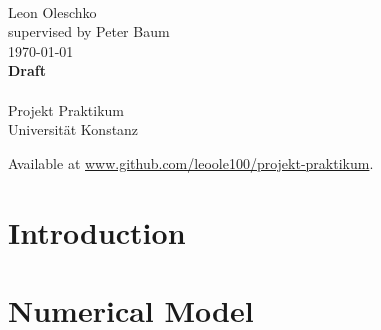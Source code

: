 \documentclass[
	a4paper,
]{scrarticle}
\begin{document}
\author{Leon Oleschko}
\date{\dotdate\today}

\begin{titlepage}
    \sffamily
    \vspace*{3cm}
    {
        \fontsize{32}{32}
    }
    \vspace{.25cm}\\
    {
        \Large
        Leon Oleschko\\
        supervised by Peter Baum
        \vspace{.05cm}\\
        \dotdate\today\\
        \textbf{Draft}\\
        \vspace{.05cm}\\
        \normalsize
        Projekt Praktikum\\
        Universität Konstanz
    }
    \vfill
    {
        \normalfont\normalsize
    }
    \vfill
    \begin{flushright}
        Available at \url{www.github.com/leoole100/projekt-praktikum}.
    \end{flushright}
\end{titlepage}


\clearpage

\section{Introduction}


\clearpage
\section{Numerical Model}
\end{document}
